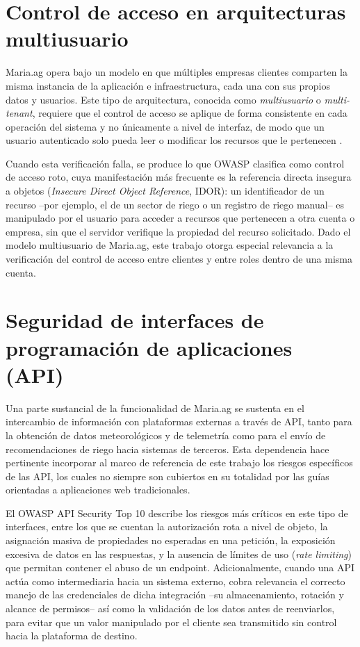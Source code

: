 \documentclass[12pt,letterpaper]{report}
\begin{document}
\section*{Control de acceso en arquitecturas multiusuario}

Maria.ag opera bajo un modelo en que múltiples empresas clientes comparten la
misma instancia de la aplicación e infraestructura, cada una con sus propios
datos y usuarios. Este tipo de arquitectura, conocida como
\textit{multiusuario} o \textit{multi-tenant}, requiere que el control de
acceso se aplique de forma consistente en cada operación del sistema y no
únicamente a nivel de interfaz, de modo que un usuario autenticado solo pueda
leer o modificar los recursos que le pertenecen \autocite{owasp2025top10}.

Cuando esta verificación falla, se produce lo que OWASP clasifica como
control de acceso roto, cuya manifestación más frecuente es la referencia
directa insegura a objetos (\textit{Insecure Direct Object Reference}, IDOR):
un identificador de un recurso --por ejemplo, el de un sector de riego o un
registro de riego manual-- es manipulado por el usuario para acceder a
recursos que pertenecen a otra cuenta o empresa, sin que el servidor verifique
la propiedad del recurso solicitado. Dado el modelo multiusuario de Maria.ag,
este trabajo otorga especial relevancia a la verificación del control de
acceso entre clientes y entre roles dentro de una misma cuenta.

\section*{Seguridad de interfaces de programación de aplicaciones (API)}

Una parte sustancial de la funcionalidad de Maria.ag se sustenta en el
intercambio de información con plataformas externas a través de API, tanto
para la obtención de datos meteorológicos y de telemetría como para el envío
de recomendaciones de riego hacia sistemas de terceros. Esta dependencia hace
pertinente incorporar al marco de referencia de este trabajo los riesgos
específicos de las API, los cuales no siempre son cubiertos en su totalidad
por las guías orientadas a aplicaciones web tradicionales.

El OWASP API Security Top 10 describe los riesgos más críticos en este tipo
de interfaces, entre los que se cuentan la autorización rota a nivel de
objeto, la asignación masiva de propiedades no esperadas en una petición, la
exposición excesiva de datos en las respuestas, y la ausencia de límites de
uso (\textit{rate limiting}) que permitan contener el abuso de un endpoint.
Adicionalmente, cuando una API actúa como intermediaria hacia un sistema
externo, cobra relevancia el correcto manejo de las credenciales de dicha
integración --su almacenamiento, rotación y alcance de permisos-- así como la
validación de los datos antes de reenviarlos, para evitar que un valor
manipulado por el cliente sea transmitido sin control hacia la plataforma de
destino.
\end{document}
